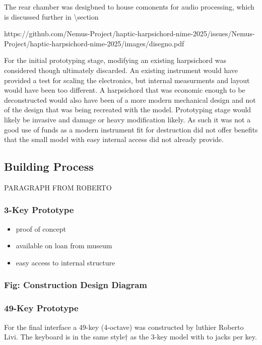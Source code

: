 The rear chamber was desigbned to house comonents for audio processing,
which is discussed further in \textbackslash section

https://github.com/Nemus-Project/haptic-harpsichord-nime-2025/issues/Nemus-Project/haptic-harpsichord-nime-2025/images/disegno.pdf

For the initial prototyping stage, modifying an existing harpsichord was
considered though ultimately discarded. An existing instrument would
have provided a test for scaling the electronics, but internal
measurments and layout would have been too different. A harpsichord that
was economic enough to be deconstructed would also have been of a more
modern mechanical design and not of the design that was being recreated
with the model. Prototyping stage would likely be invasive and damage or
heavy modification likely. As such it was not a good use of funds as a
modern instrument fit for destruction did not offer benefits that the
small model with easy internal access did not already provide.

\subsection{Building Process}\label{building-process}

PARAGRAPH FROM ROBERTO

\subsubsection{3-Key Prototype}\label{key-prototype}

\begin{itemize}
\tightlist
\item
  proof of concept
\item
  available on loan from museum
\item
  easy access to internal structure
\end{itemize}

\subsubsection{Fig: Construction Design
Diagram}\label{fig-construction-design-diagram}

\subsubsection{49-Key Prototype}\label{key-prototype-1}

For the final interface a 49-key (4-octave) was constructed by luthier
Roberto Livi. The keyboard is in the same style† as the 3-key model with
to jacks per key.

